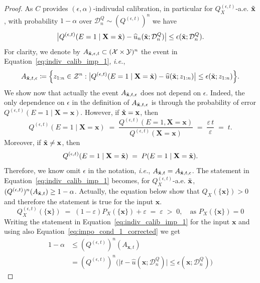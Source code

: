 \documentclass{article}
\theoremstyle{plain}
\theoremstyle{definition}
\theoremstyle{remark}
\begin{document}
\begin{proof}
As $C$ provides $(\epsilon, \alpha)$-indivudal calibration, in particular for 
$Q^{(\epsilon, t)}_X$-a.e. $\Tilde{\mathbf{x}}$, with probability $1-\alpha$ over $\mathcal{D}^Q_n \sim (Q^{(\epsilon, t)})^n$ we have
\begin{equation}
\label{eq:indiv_calib_imp_1}
\big|Q^{(\epsilon, t)}(E=1 \mid \mathbf{X}=\Tilde{\mathbf{x}}) - \widehat{u}_n(\Tilde{\mathbf{x}}; \mathcal{D}_n^Q)\big| \leq \epsilon(\Tilde{\mathbf{x}}; \mathcal{D}^Q_n).
\end{equation}
For clarity, we denote by $A_{\Tilde{\mathbf{x}},\epsilon, t} \subset (\mathcal{X} \times \mathcal{Y})^n$ the event in Equation~\eqref{eq:indiv_calib_imp_1}, \textit{i.e.},
$$
A_{\Tilde{\mathbf{x}}, t, \epsilon} \coloneqq \Big\{ z_{1:n} \in \mathcal{Z}^n
: \big|Q^{(\epsilon, t)}(E=1 \mid \mathbf{X}=\Tilde{\mathbf{x}}) - \widehat{u}(\Tilde{\mathbf{x}}; z_{1:n})\big| \leq \epsilon(\Tilde{\mathbf{x}}; z_{1:n}) \Big \}.$$
We show now that actually the event $A_{\Tilde{\mathbf{x}}, t, \epsilon}$ does not depend on $\epsilon$. Indeed, the only dependence on $\epsilon$ in the definition of $A_{\Tilde{\mathbf{x}}, t, \epsilon}$ is through the probability of error $Q^{(\epsilon, t)}(E=1\mid \mathbf{X}=\mathbf{x})$. However, if $\Tilde{\mathbf{x}} = \mathbf{x}$, then
\begin{equation}
\label{eq:impo_cond_1_corrected}
Q^{(\epsilon, t)}(E=1\mid \mathbf{X}=\mathbf{x})
\;=\;
\frac{Q^{(\epsilon, t)}(E=1,\mathbf{X}=\mathbf{x})}{Q^{(\epsilon, t)}(\mathbf{X}=\mathbf{x})}
\;=\;
\frac{\varepsilon\,t}{\varepsilon}
\;=\;
t.
\end{equation}
Moreover, if $\Tilde{\mathbf{x}} \neq \mathbf{x}$, then 
\begin{equation*}
Q^{(\epsilon, t)}(E=1\mid \mathbf{X}=\Tilde{\mathbf{x}} )
\;=\;P(E=1\mid \mathbf{X}=\Tilde{\mathbf{x}}).
\end{equation*}
Therefore, we know omit $\epsilon$ in the notation, \textit{i.e.}, $A_{\Tilde{\mathbf{x}}, t} = A_{\Tilde{\mathbf{x}}, t, \epsilon}$. The statement in Equation~\eqref{eq:indiv_calib_imp_1} becomes, for 
$Q^{(\epsilon, t)}_X$-a.e. $\Tilde{\mathbf{x}}$,
$(Q^{(\epsilon, t)})^n(A_{\Tilde{\mathbf{x}}, t}) \geq 1 - \alpha$. Actually, the equation below show that $Q_X(\{\mathbf{x}\})>0$ and therefore the statement is true for the input $\mathbf{x}$.
\[
Q_X^{(\epsilon, t)}(\{\mathbf{x}\}) \;=\; (1-\varepsilon)P_X(\{\mathbf{x}\})+\varepsilon \;=\; \varepsilon \;>\; 0, \quad \text{as }P_X(\{\mathbf{x}\}) =0
\]
Writing the statement in Equation~\eqref{eq:indiv_calib_imp_1} for the input $\mathbf{x}$ and using also Equation~\eqref{eq:impo_cond_1_corrected} we get
\begin{align*}
   \ 1-\alpha &\leq  (Q^{(\epsilon, t)})^n(A_{\mathbf{x}, t}) \\
    &= (Q^{(\epsilon, t)})^n\!\Big(\big|t - \widehat{u}(\mathbf{x}; \mathcal{D}_n^Q)\big| \leq \epsilon(\mathbf{x}; \mathcal{D}^Q_n)\Big)\  \label{eq:indiv_calib_imp_2}
\end{align*}


\end{proof}
\end{document}
